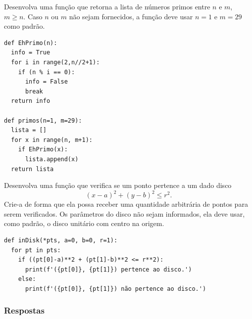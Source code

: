 \begin{exer}
  Desenvolva uma função que retorna a lista de números primos entre $n$ e $m$, $m\geq n$. Caso $n$ ou $m$ não sejam fornecidos, a função deve usar $n=1$ e $m=29$ como padrão.
\end{exer}
\begin{resp}

\begin{lstlisting}
def EhPrimo(n):
  info = True
  for i in range(2,n//2+1):
    if (n % i == 0):
      info = False
      break
  return info

def primos(n=1, m=29):
  lista = []
  for x in range(n, m+1):
    if EhPrimo(x):
      lista.append(x)
  return lista
\end{lstlisting}

\end{resp}

\begin{exer}
  Desenvolva uma função que verifica se um ponto pertence a um dado disco
  \begin{equation}
    (x-a)^2 + (y-b)^2 \leq r^2.
  \end{equation}
  Crie-a de forma que ela possa receber uma quantidade arbitrária de pontos para serem verificados. Os parâmetros do disco não sejam informados, ela deve usar, como padrão, o disco unitário com centro na origem.
\end{exer}
\begin{resp}

\begin{lstlisting}
def inDisk(*pts, a=0, b=0, r=1):
  for pt in pts:
    if ((pt[0]-a)**2 + (pt[1]-b)**2 <= r**2):
      print(f'({pt[0]}, {pt[1]}) pertence ao disco.')
    else:
      print(f'({pt[0]}, {pt[1]}) não pertence ao disco.')
\end{lstlisting}

\end{resp}

\ifisbook
\subsubsection{Respostas}
\shipoutAnswer
\fi
